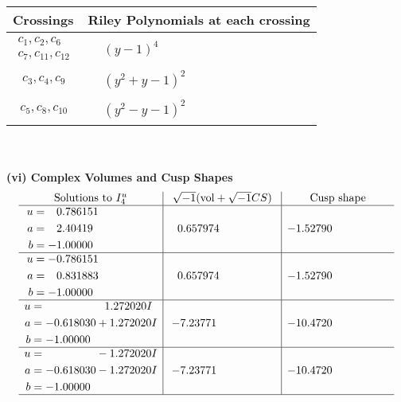 \documentclass[1p]{elsarticle_modified}
\theoremstyle{definition}
\newcommand{\I}{\sqrt{-1}}
\begin{document}
\begin{tabular}{m{50pt}|m{274pt}}
Crossings & \hspace{64pt}Riley Polynomials at each crossing \\
\hline $$\begin{aligned}c_{1},c_{2},c_{6}\\c_{7},c_{11},c_{12}\end{aligned}$$&$\begin{aligned}
&(y-1)^4
\end{aligned}$\\
\hline $$\begin{aligned}c_{3},c_{4},c_{9}\end{aligned}$$&$\begin{aligned}
&(y^2+y-1)^2
\end{aligned}$\\
\hline $$\begin{aligned}c_{5},c_{8},c_{10}\end{aligned}$$&$\begin{aligned}
&(y^2- y-1)^2
\end{aligned}$\\
\hline
\end{tabular}\\~\\
\newpage\flushleft \textbf{(vi) Complex Volumes and Cusp Shapes}
$$\begin{array}{c|c|c}  
\text{Solutions to }I^u_{4}& \I (\text{vol} + \sqrt{-1}CS) & \text{Cusp shape}\\
 \hline 
\begin{aligned}
u &= \phantom{-}0.786151\phantom{ +0.000000I} \\
a &= \phantom{-}2.40419\phantom{ +0.000000I} \\
b &= -1.00000\phantom{ +0.000000I}\end{aligned}
 & \phantom{-}0.657974\phantom{ +0.000000I} & -1.52790\phantom{ +0.000000I} \\ \hline\begin{aligned}
u &= -0.786151\phantom{ +0.000000I} \\
a &= \phantom{-}0.831883\phantom{ +0.000000I} \\
b &= -1.00000\phantom{ +0.000000I}\end{aligned}
 & \phantom{-}0.657974\phantom{ +0.000000I} & -1.52790\phantom{ +0.000000I} \\ \hline\begin{aligned}
u &= \phantom{-0.000000 -}1.272020 I \\
a &= -0.618030 + 1.272020 I \\
b &= -1.00000\phantom{ +0.000000I}\end{aligned}
 & -7.23771\phantom{ +0.000000I} & -10.4720\phantom{ +0.000000I} \\ \hline\begin{aligned}
u &= \phantom{-0.000000 } -1.272020 I \\
a &= -0.618030 - 1.272020 I \\
b &= -1.00000\phantom{ +0.000000I}\end{aligned}
 & -7.23771\phantom{ +0.000000I} & -10.4720\phantom{ +0.000000I}\\
 \hline 
 \end{array}$$\newpage\newpage\renewcommand{\arraystretch}{1}
\end{document}
